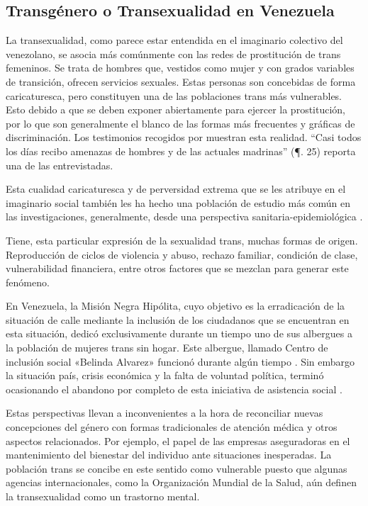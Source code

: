 \subsection{Transgénero o Transexualidad en Venezuela}

La transexualidad, como parece estar entendida en el imaginario colectivo del
venezolano, se asocia más comúnmente con las redes de prostitución de trans
femeninos. Se trata de hombres que, vestidos como mujer y con grados variables
de transición, ofrecen servicios sexuales. Estas personas son concebidas de
forma caricaturesca, pero constituyen una de las poblaciones trans más
vulnerables. Esto debido a que se deben exponer abiertamente para ejercer la
prostitución, por lo que son generalmente el blanco de las formas más frecuentes
y gráficas de discriminación. Los testimonios recogidos por \textcite{Lugo2016}
muestran esta realidad. “Casi todos los días recibo amenazas de hombres y de las
actuales madrinas” (¶. 25) reporta una de las entrevistadas.

Esta cualidad caricaturesca y de perversidad extrema que se les atribuye en el
imaginario social también les ha hecho una población de estudio más común en las
investigaciones, generalmente, desde una perspectiva sanitaria-epidemiológica
\parencite{ONUSida2012}.

Tiene, esta particular expresión de la sexualidad trans, muchas formas de
origen. Reproducción de ciclos de violencia y abuso, rechazo familiar, condición
de clase, vulnerabilidad financiera, entre otros factores que se mezclan para
generar este fenómeno.

En Venezuela, la Misión Negra Hipólita, cuyo objetivo es la erradicación de la
situación de calle mediante la inclusión de los ciudadanos que se encuentran en
esta situación, dedicó exclusivamente durante un tiempo uno de sus albergues a
la población de mujeres trans sin hogar. Este albergue, llamado Centro de
inclusión social «Belinda Alvarez» funcionó durante algún tiempo
\parencite{ASGDR2014-05}. Sin embargo la situación país, crisis económica y la
falta de voluntad política, terminó ocasionando el abandono por completo de esta
iniciativa de asistencia social \parencite{ACDV,Gay2014-04-16}.

Estas perspectivas llevan a inconvenientes a la hora de reconciliar nuevas
concepciones del género con formas tradicionales de atención médica y otros
aspectos relacionados. Por ejemplo, el papel de las empresas aseguradoras en el
mantenimiento del bienestar del individuo ante situaciones inesperadas. La
población trans se concibe en este sentido como vulnerable puesto que algunas
agencias internacionales, como la Organización Mundial de la Salud, aún definen
la transexualidad como un trastorno mental.

